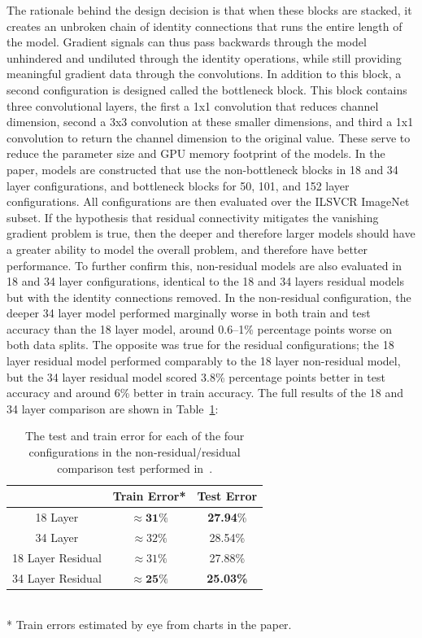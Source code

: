 The rationale behind the design decision is that when these blocks are stacked, it creates an unbroken chain of
identity connections that runs the entire length of the model. Gradient signals can thus pass backwards through the model
unhindered and undiluted through the identity operations, while still providing meaningful gradient data through the
convolutions. In addition to this block, a second configuration is designed called the bottleneck block. This block
contains three convolutional layers, the first a 1x1 convolution that reduces channel dimension, second a 3x3 convolution
at these smaller dimensions, and third a 1x1 convolution to return the channel dimension to the original value. These
serve to reduce the parameter size and GPU memory footprint of the models. In the paper, models are constructed that
use the non-bottleneck blocks in 18 and 34 layer configurations, and bottleneck blocks for 50, 101, and 152 layer configurations.
All configurations are then evaluated over the ILSVCR ImageNet subset. If the hypothesis that residual connectivity mitigates
the vanishing gradient problem is true, then the deeper and therefore larger models
should have a greater ability to model the overall problem, and therefore have better performance. To further confirm this,
non-residual models are also evaluated in 18 and 34 layer configurations, identical to the 18 and 34 layers residual models
but with the identity connections removed. In the non-residual configuration, the deeper 34 layer model performed
marginally worse in both train and test accuracy than the 18 layer model, around 0.6--1\% percentage points worse
on both data splits. The opposite was true for the residual configurations; the 18 layer residual model performed
comparably to the 18 layer non-residual model, but the 34 layer residual model scored 3.8\% percentage points better in
test accuracy and around 6\% better in train accuracy. The full results of the 18 and 34 layer comparison are shown in
Table~\ref{tab:resnet1834}:

\begin{table}[ht]
\begin{center}
\begin{tabular}{c|c|c}
                    & Train Error*  & Test Error \\
\hline
18 Layer            & $\mathbf{\approx 31}\%$   & \textbf{27.94}\% \\
34 Layer           &  $\approx 32\%$            & 28.54\% \\
\hline
18 Layer Residual   & $\approx 31\%$            & 27.88\% \\
34 Layer Residual   & $\mathbf{\approx25\%}$    & \textbf{25.03\%} \\
\end{tabular}
\\[1em]
* Train errors estimated by eye from charts in the paper.
\end{center}

\caption[Test and train error of residual and non-residual ResNets]{The test and train error for each of the four configurations in the non-residual/residual
comparison test performed in~\cite{he2015}.}
\label{tab:resnet1834}
\end{table}


